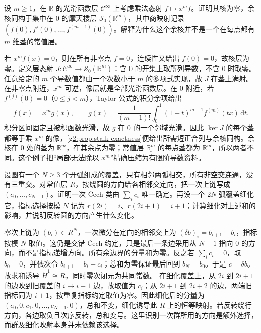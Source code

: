 \begin{exercise}\label{g2:ex:smooth-jet-cokernel}
	设 \(m\ge1\)，在 \(\mathbb R\) 的光滑函数层 \(\mathcal C^{\infty}\) 上考虑乘法态射 \(f\mapsto x^m f\)。证明其核为零，余核同构于集中在 \(0\) 的摩天楼层 \(\mathcal S_0(\mathbb R^m)\)，其中商映射记录 \((f(0),f'(0),\ldots,f^{(m-1)}(0))\)。解释为什么这个余核并不是一个在每点都有 \(m\) 维茎的常值层。
\end{exercise}
\begin{solution}
	若 \(x^m f(x)=0\)，则在所有非零点 \(f=0\)，连续性又给出 \(f(0)=0\)，故核层为零。定义层态射 \(J:\mathcal C^{\infty}\to\mathcal S_0(\mathbb R^m)\)：含 \(0\) 的开集上取所列导数，不含 \(0\) 时取零。任意给定的 \(m\) 个导数值都由一个次数小于 \(m\) 的多项式实现，故 \(J\) 在茎上满射。
	在非零点附近，\(x^m\) 可逆，像层就是全部光滑函数层。在 \(0\) 附近，若 \(f^{(j)}(0)=0\)（\(0\le j<m\)），Taylor 公式的积分余项给出
	\[
		f(x)=x^m g(x),\qquad
		g(x)=\frac1{(m-1)!}\int_0^1(1-t)^{m-1}f^{(m)}(tx)\,\mathrm dt.
	\]
	积分区间固定且被积函数光滑，故 \(g\) 在 \(0\) 的一个邻域光滑。因此 \(\ker J\) 的每个茎都等于乘 \(x^m\) 的像，\cref{g2:prop:stalk-exactness}便给出所需短正合列与余核同构。余核在 \(0\) 处的茎为 \(\mathbb R^m\)，在其余点为零；常值层 \(\underline{\mathbb R^m}\) 的每点茎都为 \(\mathbb R^m\)，所以两者不同。这个例子把“局部无法除以 \(x^m\)”精确压缩为有限阶导数资料。
\end{solution}

\begin{exercise}\label{g2:ex:cech-cycle-refinement}
	设圆有一个 \(N\ge3\) 个开弧组成的覆盖，只有相邻两弧相交，所有非空交连通，没有三重交。对常值层 \(\underline R\)，按绕圆的方向给各相邻交定向，把一次上链写成 \((c_0,\ldots,c_{N-1})\)。证明一次 Čech 类由 \(\sum_i c_i\) 唯一确定。再设一个 \(2N\) 弧覆盖细化它，指标选择按模 \(N\) 记为 \(r(2i)=i\)、\(r(2i+1)=i+1\)；计算细化对上述和的影响，并说明反转圆的方向产生什么变化。
\end{exercise}
\begin{solution}
	零次上链为 \((b_i)\in R^N\)，一次微分在定向的相邻交上为 \((\delta b)_i=b_{i+1}-b_i\)，指标按模 \(N\) 取值。这仍是交错 Čech 约定，只是最后一条边采用从 \(N-1\) 指向 \(0\) 的方向，而不是指标递增方向。所有余边界的分量和为零。反之若 \(\sum_i c_i=0\)，取 \(b_0=0\)，并依次令 \(b_{i+1}=b_i+c_i\)；总和为零保证最后回到 \(b_N=b_0\)。于是 \(c=\delta b\)。故求和诱导 \(\check H^1\cong R\)，同时零次闭元为共同常数。
	在细化覆盖上，从 \(2i\) 到 \(2i+1\) 的边映到旧覆盖的 \(i\to i+1\) 边，故取值为 \(c_i\)；从 \(2i+1\) 到 \(2i+2\) 的边，两端旧指标同为 \(i+1\)，按重复指标约定取值为零。因此细化后的分量为 \((c_0,0,c_1,0,\ldots,c_{N-1},0)\)，总和不变，细化诱导此 \(R\) 上的恒等映射。若反转绕行方向，各边取负且次序反转，总和变号。这里识别一次群所用的方向是额外选择，而群及细化映射本身并未依赖该选择。
\end{solution}

